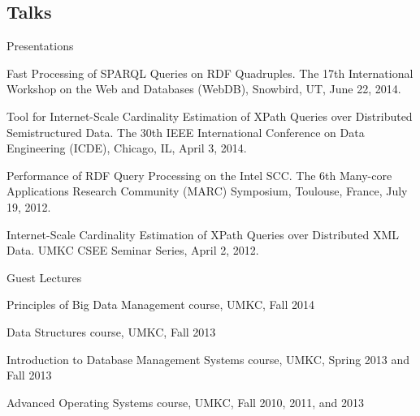 \documentclass[margin,line]{resume}
\begin{document}
\begin{resume}


\newpage
    \section{\mysidestyle Talks}
    \begin{list2}
    \item Presentations
    \begin{list3}
    \item Fast Processing of SPARQL Queries on RDF Quadruples. The 17th International Workshop on the Web and Databases (WebDB), Snowbird, UT, June 22, 2014.
    \item Tool for Internet-Scale Cardinality Estimation of XPath Queries over Distributed Semistructured Data. The 30th IEEE International Conference on Data Engineering (ICDE), Chicago, IL, April 3, 2014.
    \item Performance of RDF Query Processing on the Intel SCC. The 6th Many-core Applications Research Community (MARC) Symposium, Toulouse, France, July 19, 2012.
    \item Internet-Scale Cardinality Estimation of XPath Queries over Distributed XML Data. UMKC CSEE Seminar Series, April 2, 2012.
    \end{list3}
    \item Guest Lectures
    \begin{list3}
    \item Principles of Big Data Management course, UMKC, Fall 2014
    \item Data Structures course, UMKC, Fall 2013
    \item Introduction to Database Management Systems course, UMKC, Spring 2013 and Fall 2013
    \item Advanced Operating Systems course, UMKC, Fall 2010, 2011, and 2013
    \end{list3}
    \end{list2}


\end{resume}
\end{document}
